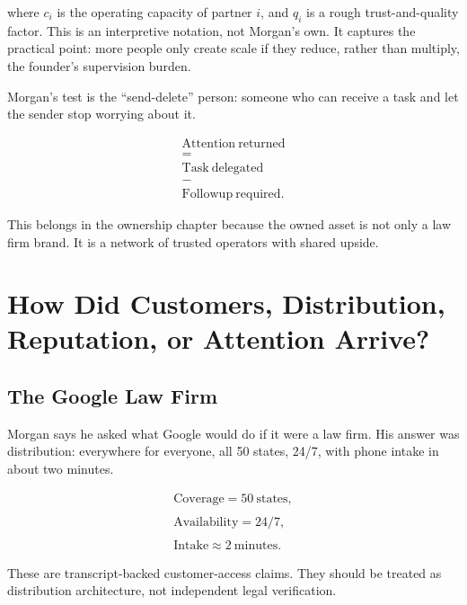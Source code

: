 \documentclass[11pt,oneside]{book}
\begin{document}
where \(c_i\) is the operating capacity of partner \(i\), and \(q_i\) is a rough trust-and-quality factor. This is an interpretive notation, not Morgan's own. It captures the practical point: more people only create scale if they reduce, rather than multiply, the founder's supervision burden.

Morgan's test is the ``send-delete'' person: someone who can receive a task and let the sender stop worrying about it.

\begin{equation}
\begin{gathered}
\mathrm{Attention\ returned}\\
=\\
\mathrm{Task\ delegated}\\
-\\
\mathrm{Followup\ required}.
\end{gathered}
\end{equation}

This belongs in the ownership chapter because the owned asset is not only a law firm brand. It is a network of trusted operators with shared upside.

\chapter{How Did Customers, Distribution, Reputation, or Attention Arrive?}

\section{The Google Law Firm}

Morgan says he asked what Google would do if it were a law firm. His answer was distribution: everywhere for everyone, all 50 states, 24/7, with phone intake in about two minutes.

\begin{equation}
\begin{gathered}
\mathrm{Coverage}=50\ \mathrm{states},\\
\qquad\\
\mathrm{Availability}=24/7,\\
\qquad\\
\mathrm{Intake}\approx 2\ \mathrm{minutes}.
\end{gathered}
\end{equation}

These are transcript-backed customer-access claims. They should be treated as distribution architecture, not independent legal verification.
\end{document}
